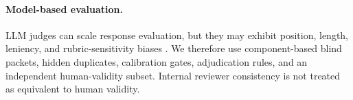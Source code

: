 \paragraph{Model-based evaluation.}
LLM judges can scale response evaluation, but they may exhibit position, length, leniency, and rubric-sensitivity biases \citep{shi2024positionbias,thakur2024judges}. We therefore use component-based blind packets, hidden duplicates, calibration gates, adjudication rules, and an independent human-validity subset. Internal reviewer consistency is not treated as equivalent to human validity.
